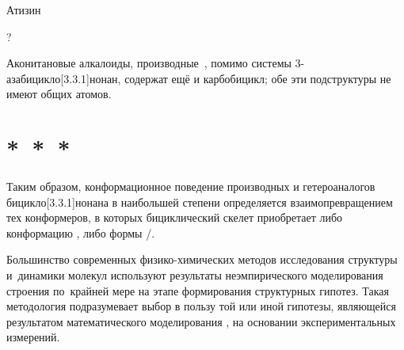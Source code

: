 Атизин~
\begin{center}

\end{center}?

Аконитановые алкалоиды, производные~, помимо системы 3-азабицикло[3.3.1]нонан, содержат ещё и карбобицикл; обе эти подструктуры не имеют общих атомов.

\begin{center}
  
\end{center}

\section*{*~*~*}

Таким образом, конформационное поведение производных и гетероаналогов бицикло[3.3.1]нонана в наибольшей степени определяется взаимопревращением тех конформеров, в которых бициклический скелет приобретает либо конформацию \CC{}, либо формы \BC{}/\CB{}.

Большинство современных физико-химических методов исследования структуры и~динамики молекул используют результаты неэмпирического моделирования строения по~крайней мере на этапе формирования структурных гипотез. Такая методология подразумевает выбор в пользу той или иной гипотезы, являющейся результатом математического моделирования , на основании экспериментальных измерений.